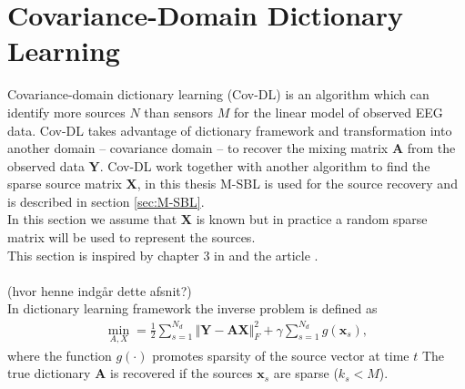 \section{Covariance-Domain Dictionary Learning}\label{sec:Cov-DL}
Covariance-domain dictionary learning (Cov-DL) is an algorithm which can identify more sources $N$ than sensors $M$ for the linear model of observed EEG data.
Cov-DL takes advantage of dictionary framework and transformation into another domain -- covariance domain -- to recover the mixing matrix $\mathbf{A}$ from the observed data $\mathbf{Y}$. Cov-DL work together with another algorithm to find the sparse source matrix $\mathbf{X}$, in this thesis M-SBL is used for the source recovery and is described in section \ref{sec:M-SBL}. 
\\
In this section we assume that $\mathbf{X}$ is known but in practice a random sparse matrix will be used to represent the sources. 
\\
This section is inspired by chapter 3 in \cite{phd2015} and the article \cite{Balkan2015}.
\\ \\
(hvor henne indgår dette afsnit?)\\ 
In dictionary learning framework the inverse problem is defined as
\begin{align*}
\min_{A,X} = \frac{1}{2} \sum_{s=1}^{N_d} \Vert \mathbf{Y} - \mathbf{AX} \Vert_F^2 + \gamma \sum_{s=1}^{N_d} g(\mathbf{x}_s),
\end{align*}
where the function $g(\cdot)$ promotes sparsity of the source vector at time $t$ 
The true dictionary $\mathbf{A}$ is recovered if the sources $\mathbf{x}_s$ are sparse ($k_s < M$).
\\ \\ 

